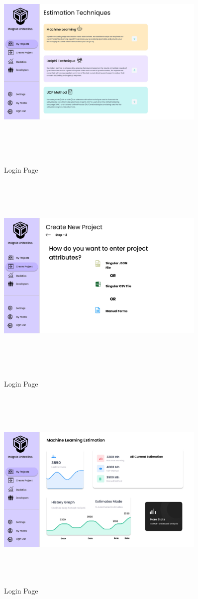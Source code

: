 \begin{figure}[H]
\pagebreak
\includegraphics[height=10cm, width=0.9\textwidth]{./images/prototype/0011}
\centering 
\caption{Login Page}
\label{fig:prototype1}


\pagebreak
\includegraphics[height=10cm, width=0.9\textwidth]{./images/prototype/0012}
\centering 
\caption{Login Page}
\label{fig:prototype1}

\includegraphics[height=10cm, width=0.9\textwidth]{./images/prototype/0013}
\centering 
\caption{Login Page}
\label{fig:prototype1}


\end{figure}
